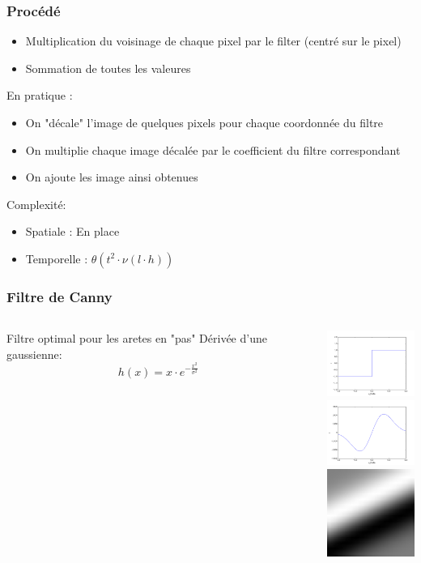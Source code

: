 \documentclass[french]{beamer}
\begin{document}
\begin{frame}
	\frametitle{Procédé}
	\begin{itemize}
		\item Multiplication du voisinage de chaque pixel par le filter (centré sur le pixel)
		\item Sommation de toutes les valeures
	\end{itemize}
	En pratique : 
	\begin{itemize}
		\item On "décale" l'image de quelques pixels pour chaque coordonnée du filtre
		\item On multiplie chaque image décalée par le coefficient du filtre correspondant
		\item On ajoute les image ainsi obtenues
	\end{itemize}
	Complexité:
	\begin{itemize}
		\item Spatiale : En place
		\item Temporelle : $\theta(t^2 \cdot \nu(l \cdot h))$
	\end{itemize}
\end{frame}

\begin{frame}
	\frametitle{Filtre de Canny}
	\begin{columns}
		\begin{column}{5cm}
			Filtre optimal pour les aretes en "pas" 
			Dérivée d'une gaussienne:
			$$h(x) = x \cdot e^{-\frac{x^2}{\sigma^2}}$$
		\end{column}
		\begin{column}{5cm}
			\includegraphics[width=3cm]{images/step.png}\\
			\includegraphics[width=3cm]{images/gaussd1d.png}\\
			\includegraphics[width=3cm]{images/gaussd.png}
		\end{column}
	\end{columns}
\end{frame}
\end{document}
